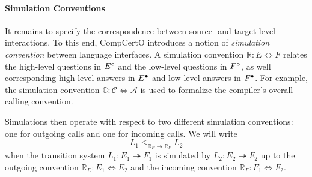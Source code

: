 \documentclass[sigplan,10pt,authordraft]{acmart}
\begin{document}
\paragraph{Simulation Conventions} %

It remains to specify the correspondence
between source- and target-level interactions.
To this end,
CompCertO introduces a notion of \emph{simulation convention}
between language interfaces.
A simulation convention $\mathbb{R} : E \Leftrightarrow F$
relates
the high-level questions in $E^\circ$ and
the low-level questions in $F^\circ$,
as well corresponding
high-level answers in $E^\bullet$ and
low-level answers in $F^\bullet$.
For example,
the simulation convention
$\mathbb{C} : \mathcal{C} \Leftrightarrow \mathcal{A}$
is used to formalize the compiler's
overall calling convention.

Simulations then operate with respect to
two different simulation conventions:
one for outgoing calls and one for incoming calls.
We will write
\[
  L_1 \le_{\mathbb{R}_E \twoheadrightarrow \mathbb{R}_F} L_2
\]
when the transition system
$L_1 : E_1 \twoheadrightarrow F_1$
is simulated by
$L_2 : E_2 \twoheadrightarrow F_2$
up to the outgoing convention
$\mathbb{R}_E : E_1 \Leftrightarrow E_2$
and the incoming convention
$\mathbb{R}_F : F_1 \Leftrightarrow F_2$.
\end{document}
